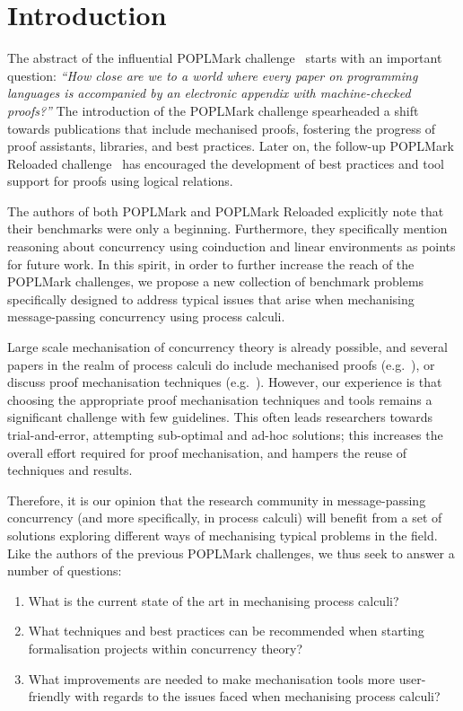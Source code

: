 \documentclass[runningheads]{llncs}
\begin{document}
\section{Introduction}


The abstract of the influential POPLMark challenge~\cite{POPLMark} starts with
an important question: \emph{``How close are we to a world where every paper on
programming languages is accompanied by an electronic appendix with
machine-checked proofs?''} The introduction of the POPLMark
challenge spearheaded a shift towards publications that include
mechanised proofs, fostering the progress of proof assistants,
libraries, and best practices.  Later on, the follow-up POPLMark
Reloaded challenge~\cite{POPLMarkReloaded} has encouraged the development of
best practices and tool support for proofs using logical relations.

The authors of both POPLMark and POPLMark Reloaded explicitly
note that their benchmarks were only a beginning.  Furthermore, they
specifically mention reasoning about concurrency using coinduction and
linear environments as points for future work.  In this spirit, in order to
further increase the reach of the POPLMark challenges, we propose a new
collection of benchmark problems specifically designed to address typical issues
that arise when mechanising message-passing concurrency using process calculi.

Large scale mechanisation of concurrency theory is already possible,
and several papers in the realm of process calculi do include mechanised proofs
(e.g.~\cite{DBLP:conf/pldi/Castro-Perez0GY21,DBLP:conf/tacas/CastroFY20,lmcs:9985,
  DBLP:journals/jar/CruzFilipeMP23, Tirore:2023}), or
discuss proof mechanisation techniques
(e.g.~\cite{DBLP:journals/jar/BengtsonPW16, DBLP:conf/tphol/Gay01,
  DBLP:conf/ppdp/Thiemann19, DBLP:conf/forte/ZalakainD21}).  However, our
experience is that choosing the appropriate proof mechanisation techniques and
tools remains a significant challenge with few guidelines.  This often leads
researchers towards trial-and-error, attempting sub-optimal and ad-hoc
solutions; this increases the overall effort required for proof mechanisation,
and hampers the reuse of techniques and results.

Therefore, it is our opinion that the research community in message-passing
concurrency (and more specifically, in process calculi) will benefit from a set
of solutions exploring different ways of mechanising typical problems in the
field. Like the authors of the previous POPLMark challenges, we thus seek to
answer a number of questions:
\begin{enumerate}
\item What is the current state of the art in mechanising process calculi?
\item What techniques and best practices can be recommended when starting formalisation projects within concurrency theory?
\item What improvements are needed to make mechanisation tools more user-friendly with regards to the issues faced when mechanising process calculi?
\end{enumerate}
\end{document}

